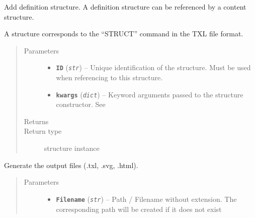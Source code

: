\documentclass[letterpaper,10pt,english]{sphinxmanual}
\begin{document}
\begin{fulllineitems}
\begin{fulllineitems}
\end{fulllineitems}


\begin{fulllineitems}
\label{Chapters/PythonModuleReference/TXLWriter/TXLWizard.TXLWriter:TXLWizard.TXLWriter.TXLWriter.AddDefinitionStructure}
Add definition structure. A definition structure can be referenced by a content structure.

A structure corresponds to the ``STRUCT'' command in the TXL file format.
\begin{quote}\begin{description}
\item[{Parameters}] \leavevmode\begin{itemize}
\item {} 
\textbf{\texttt{ID}} (\emph{\texttt{str}}) -- Unique identification of the structure. Must be used when referencing to this structure.

\item {} 
\textbf{\texttt{kwargs}} (\emph{\texttt{dict}}) -- Keyword arguments passed to the structure constructor. See {\hyperref[Chapters/PythonModuleReference/Patterns/TXLWizard.Patterns.Structure:TXLWizard.Patterns.Structure.Structure]{}}

\end{itemize}

\item[{Returns}] \leavevmode


\item[{Return type}] \leavevmode
{\hyperref[Chapters/PythonModuleReference/Patterns/TXLWizard.Patterns.Structure:TXLWizard.Patterns.Structure.Structure]{}} structure instance

\end{description}\end{quote}

\end{fulllineitems}


\begin{fulllineitems}
\label{Chapters/PythonModuleReference/TXLWriter/TXLWizard.TXLWriter:TXLWizard.TXLWriter.TXLWriter.GenerateFiles}
Generate the output files (.txl, .svg, .html).
\begin{quote}\begin{description}
\item[{Parameters}] \leavevmode\begin{itemize}
\item {} 
\textbf{\texttt{Filename}} (\emph{\texttt{str}}) -- Path / Filename without extension.
The corresponding path will be created if it does not exist


\end{itemize}
\end{description}
\end{quote}
\end{fulllineitems}
\end{fulllineitems}
\end{document}
